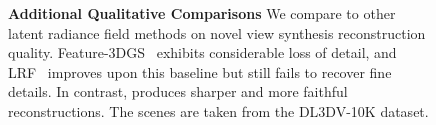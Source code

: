\begin{figure}[t]
\begin{tabular}{@{}cccc@{}}
\end{tabular}
\caption{\textbf{Additional Qualitative Comparisons} We compare \paper to other latent radiance field methods on novel view synthesis reconstruction quality. Feature-3DGS~\cite{zhou2024feature} exhibits considerable loss of detail, and LRF~\cite{zhou2025latent} improves upon this baseline but still fails to recover fine details. In contrast, \paper produces sharper and more faithful reconstructions. The scenes are taken from the DL3DV-10K dataset.}


\label{fig:qualitative_supp}
\end{figure}